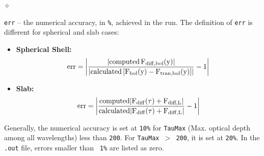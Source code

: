 \documentclass[11pt]{article}
\begin{document}
\begin{list}{$\diamond$}{}
\item {\tt err} -- the numerical accuracy, in {\tt \%}, achieved in the run.
    The definition of {\tt err} is different for spherical and slab cases:
%
\begin{itemize}
%
\item {\bf Spherical Shell:}
\begin{equation}
\rm{err} =
 \left|\frac{{\rm{|computed}}\,F_{\rm{diff,bol}}(y)|}
      {{\rm{|calculated}}\,[F_{\rm{bol}}(y) - F_{\rm{tran, bol}}(y)]|}
       - 1 \right|
\label{fluxconsvsphere2}
\end{equation}
%
\item {\bf Slab:}
\begin{equation}
\rm{err} = \left|\frac{\mbox{computed}|F_{\rm{diff}}(\tau) + F_{\mbox{\scriptsize
diff},L}|}{\mbox{calculated}|F_{\rm{diff}} (\tau)+ F_{\rm{diff},L}|}
-1 \right|
\end{equation}
%
\end{itemize}

Generally, the numerical accuracy is set at {\tt 10\%} for {\tt TauMax} (Max.
optical depth among all wavelengths) less than {\tt 200}. For {\tt TauMax $>$
200}, it is set at {\tt 20\%}. In the {\tt .out} file, errors smaller than {\tt
1\%} are listed as zero.
\end{list}
\end{document}
